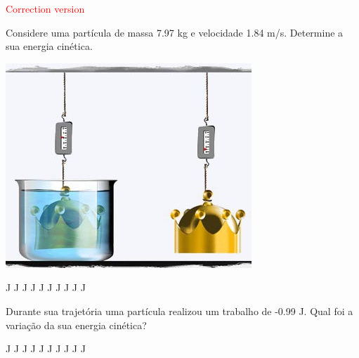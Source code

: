 \documentclass[12pt, addpoints]{exam}
\begin{document}
        \begin{center}
\textcolor{red}{\emph\Large Correction version}\end{center}
\begin{questions}
\begin{multicols*}{2}
\question[33] Considere uma partícula de massa    7.97 kg e velocidade    1.84 m/s. Determine a sua energia cinética.

\begin{center}
\begin{minipage}[c]{0.75\linewidth}
\includegraphics[width=\textwidth]{MWE001.jpg}
\end{minipage}

\end{center}
\begin{oneparchoices}
 J J J J J J J J J J\end{oneparchoices}

\begin{oneparchoices}
\end{oneparchoices}
\question[23] Durante sua trajetória uma partícula realizou um trabalho de   -0.99 J. Qual foi a variação da sua energia cinética?

\begin{oneparchoices}
 J J J J J J J J J J\end{oneparchoices}

\begin{oneparchoices}
\end{oneparchoices}
\end{multicols*}
\end{questions}
\newpage
\end{document}
